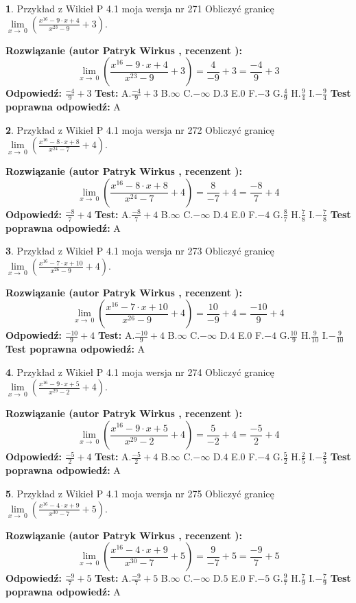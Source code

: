 \documentclass[12pt, a4paper]{article}
\theoremstyle{definition} %
\newtheorem{zad}{}
\newcommand{\zadStart}[1]{\begin{zad}#1\newline}
\newcommand{\zadStop}{\end{zad}}
\newcommand{\rozwStart}[2]{\noindent \textbf{Rozwiązanie (autor #1 , recenzent #2): }\newline}
\newcommand{\rozwStop}{\newline}
\newcommand{\odpStart}{\noindent \textbf{Odpowiedź:}\newline}
\newcommand{\odpStop}{\newline}
\newcommand{\testStart}{\noindent \textbf{Test:}\newline}
\newcommand{\testStop}{\newline}
\newcommand{\kluczStart}{\noindent \textbf{Test poprawna odpowiedź:}\newline}
\newcommand{\kluczStop}{\newline}
\begin{document}
\zadStart{Przykład z Wikieł P 4.1 moja wersja nr 271}
Obliczyć granicę $\lim\limits_{x\to\ 0}(\frac{x^{16}-9 \cdot x +4}{x^{23}-9}+3)$.
\zadStop
\rozwStart{Patryk Wirkus}{}
$$\lim\limits_{x\to\ 0}(\frac{x^{16}-9 \cdot x +4}{x^{23}-9}+3)=\frac{4}{-9}+3=\frac{-4}{9}+3$$
\rozwStop
\odpStart
$\frac{-4}{9}+3$
\odpStop
\testStart
A.$\frac{-4}{9}+3$
B.$\infty$
C.$-\infty$
D.$3$
E.$0$
F.$-3$
G.$\frac{4}{9}$
H.$\frac{9}{4}$
I.$-\frac{9}{4}$
\testStop
\kluczStart
A
\kluczStop



\zadStart{Przykład z Wikieł P 4.1 moja wersja nr 272}
Obliczyć granicę $\lim\limits_{x\to\ 0}(\frac{x^{16}-8 \cdot x +8}{x^{24}-7}+4)$.
\zadStop
\rozwStart{Patryk Wirkus}{}
$$\lim\limits_{x\to\ 0}(\frac{x^{16}-8 \cdot x +8}{x^{24}-7}+4)=\frac{8}{-7}+4=\frac{-8}{7}+4$$
\rozwStop
\odpStart
$\frac{-8}{7}+4$
\odpStop
\testStart
A.$\frac{-8}{7}+4$
B.$\infty$
C.$-\infty$
D.$4$
E.$0$
F.$-4$
G.$\frac{8}{7}$
H.$\frac{7}{8}$
I.$-\frac{7}{8}$
\testStop
\kluczStart
A
\kluczStop



\zadStart{Przykład z Wikieł P 4.1 moja wersja nr 273}
Obliczyć granicę $\lim\limits_{x\to\ 0}(\frac{x^{16}-7 \cdot x +10}{x^{26}-9}+4)$.
\zadStop
\rozwStart{Patryk Wirkus}{}
$$\lim\limits_{x\to\ 0}(\frac{x^{16}-7 \cdot x +10}{x^{26}-9}+4)=\frac{10}{-9}+4=\frac{-10}{9}+4$$
\rozwStop
\odpStart
$\frac{-10}{9}+4$
\odpStop
\testStart
A.$\frac{-10}{9}+4$
B.$\infty$
C.$-\infty$
D.$4$
E.$0$
F.$-4$
G.$\frac{10}{9}$
H.$\frac{9}{10}$
I.$-\frac{9}{10}$
\testStop
\kluczStart
A
\kluczStop



\zadStart{Przykład z Wikieł P 4.1 moja wersja nr 274}
Obliczyć granicę $\lim\limits_{x\to\ 0}(\frac{x^{16}-9 \cdot x +5}{x^{29}-2}+4)$.
\zadStop
\rozwStart{Patryk Wirkus}{}
$$\lim\limits_{x\to\ 0}(\frac{x^{16}-9 \cdot x +5}{x^{29}-2}+4)=\frac{5}{-2}+4=\frac{-5}{2}+4$$
\rozwStop
\odpStart
$\frac{-5}{2}+4$
\odpStop
\testStart
A.$\frac{-5}{2}+4$
B.$\infty$
C.$-\infty$
D.$4$
E.$0$
F.$-4$
G.$\frac{5}{2}$
H.$\frac{2}{5}$
I.$-\frac{2}{5}$
\testStop
\kluczStart
A
\kluczStop



\zadStart{Przykład z Wikieł P 4.1 moja wersja nr 275}
Obliczyć granicę $\lim\limits_{x\to\ 0}(\frac{x^{16}-4 \cdot x +9}{x^{30}-7}+5)$.
\zadStop
\rozwStart{Patryk Wirkus}{}
$$\lim\limits_{x\to\ 0}(\frac{x^{16}-4 \cdot x +9}{x^{30}-7}+5)=\frac{9}{-7}+5=\frac{-9}{7}+5$$
\rozwStop
\odpStart
$\frac{-9}{7}+5$
\odpStop
\testStart
A.$\frac{-9}{7}+5$
B.$\infty$
C.$-\infty$
D.$5$
E.$0$
F.$-5$
G.$\frac{9}{7}$
H.$\frac{7}{9}$
I.$-\frac{7}{9}$
\testStop
\kluczStart
A
\kluczStop
\end{document}
